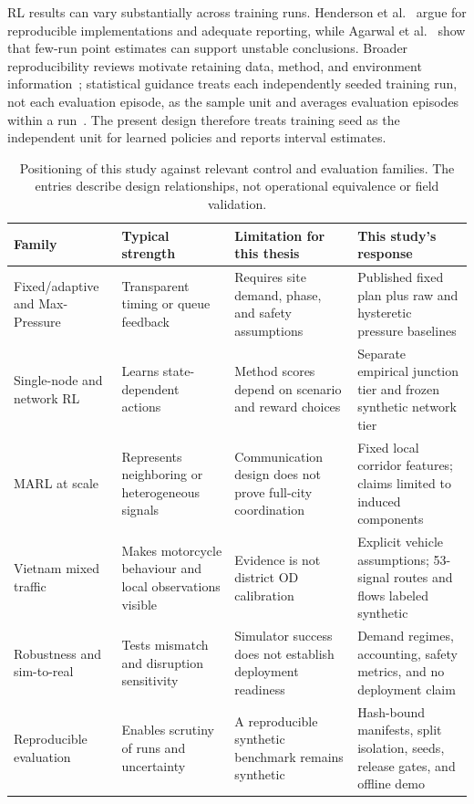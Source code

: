 \documentclass[12pt,a4paper]{report}
\begin{document}
RL results can vary substantially across training runs. Henderson et al.~\cite{henderson2018matters} argue for reproducible implementations and adequate reporting, while Agarwal et al.~\cite{agarwal2021precipice} show that few-run point estimates can support unstable conclusions. Broader reproducibility reviews motivate retaining data, method, and environment information~\cite{gundersen2018reproducibility,pineau2021reproducibility}; statistical guidance treats each independently seeded training run, not each evaluation episode, as the sample unit and averages evaluation episodes within a run~\cite{colas2019hitchhiker}. The present design therefore treats training seed as the independent unit for learned policies and reports interval estimates.

\begin{table}[H]
\centering
\caption{Positioning of this study against relevant control and evaluation families. The entries describe design relationships, not operational equivalence or field validation.}\label{tab:related-work-position}
\scriptsize
\begin{tabularx}{\textwidth}{p{2.45cm}p{2.05cm}p{2.15cm}>{\raggedright\arraybackslash}X}
\toprule
Family & Typical strength & Limitation for this thesis & This study's response \\
\midrule
Fixed/adaptive and Max-Pressure~\cite{webster1958signals,sims1980scat,robertson1991scoot,varaiya2013maxpressure} & Transparent timing or queue feedback & Requires site demand, phase, and safety assumptions & Published fixed plan plus raw and hysteretic pressure baselines \\
Single-node and network RL~\cite{abdulhai2003adaptive,wei2018intellilight,chu2020marl} & Learns state-dependent actions & Method scores depend on scenario and reward choices & Separate empirical junction tier and frozen synthetic network tier \\
MARL at scale~\cite{wei2019colight,devailly2022igrl,zhang2024heterolight} & Represents neighboring or heterogeneous signals & Communication design does not prove full-city coordination & Fixed local corridor features; claims limited to induced components \\
Vietnam mixed traffic~\cite{ngoc2009vietnam,nguyen2012motorcycle,phan2025danang} & Makes motorcycle behaviour and local observations visible & Evidence is not district OD calibration & Explicit vehicle assumptions; 53-signal routes and flows labeled synthetic \\
Robustness and sim-to-real~\cite{muller2023realitygap,da2023sim2real,korecki2023disruptions} & Tests mismatch and disruption sensitivity & Simulator success does not establish deployment readiness & Demand regimes, accounting, safety metrics, and no deployment claim \\
Reproducible evaluation~\cite{ault2021resco,henderson2018matters,agarwal2021precipice} & Enables scrutiny of runs and uncertainty & A reproducible synthetic benchmark remains synthetic & Hash-bound manifests, split isolation, seeds, release gates, and offline demo \\
\bottomrule
\end{tabularx}
\end{table}
\end{document}
